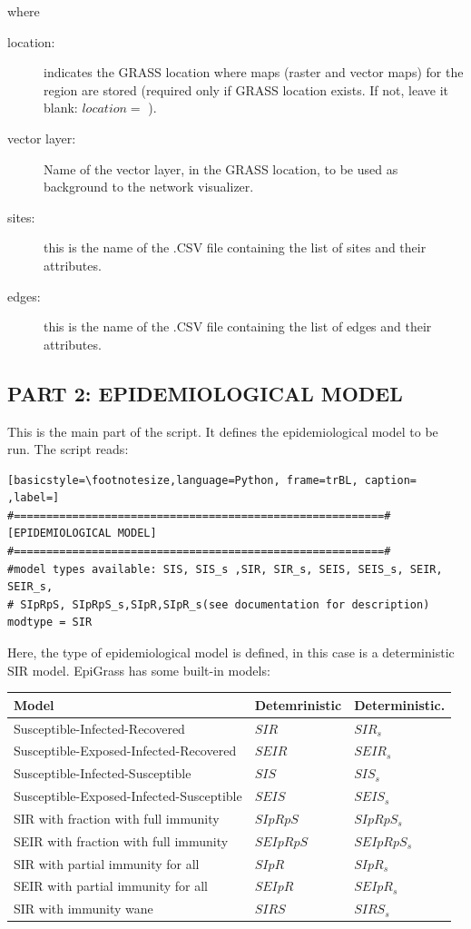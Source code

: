 where 

\begin{description}
\item[location:] indicates the GRASS location where maps (raster and vector maps) for the region are stored (required only if GRASS location exists. If not, leave it blank: $location =$ ). 
\item[vector layer:] Name of the vector layer, in the GRASS location, to be used as background to the network visualizer. 
\item[sites:] this is the name of the .CSV file containing the list of sites and their attributes.
\item[edges:] this is the name of the .CSV file containing the list of edges and their attributes.
\end{description}

\subsection{PART 2: EPIDEMIOLOGICAL MODEL}

This is the main part of the script. It defines the epidemiological model to be run.
The script reads:

\begin{lstlisting}[basicstyle=\footnotesize,language=Python, frame=trBL, caption= ,label=]
#=========================================================#
[EPIDEMIOLOGICAL MODEL]
#=========================================================#
#model types available: SIS, SIS_s ,SIR, SIR_s, SEIS, SEIS_s, SEIR, SEIR_s, 
# SIpRpS, SIpRpS_s,SIpR,SIpR_s(see documentation for description)
modtype = SIR

\end{lstlisting}

Here, the type of epidemiological model is defined, in this case is a deterministic SIR model. EpiGrass has some built-in models:


\begin{center}
\begin{tabular}{l l l}
\hline 
\textbf{Model}	&\textbf{Detemrinistic} &\textbf{Deterministic}. \\ \hline	
Susceptible-Infected-Recovered  & $SIR$	& $SIR_s$\\
Susceptible-Exposed-Infected-Recovered & $SEIR$	& $SEIR_s$\\
Susceptible-Infected-Susceptible & $SIS$  &  $SIS_s$\\
Susceptible-Exposed-Infected-Susceptible & $SEIS$ & $SEIS_s$\\
SIR with fraction with full immunity & $SIpRpS$ & $SIpRpS_s$\\
SEIR with fraction with full immunity & $SEIpRpS$ & $SEIpRpS_s$\\
SIR with partial immunity for all & $SIpR$ & $SIpR_s$\\
SEIR with partial immunity for all & $SEIpR$ & $SEIpR_s$\\
SIR with immunity wane & $SIRS$ & $SIRS_s$\\
\hline
\end{tabular}
\end{center}

